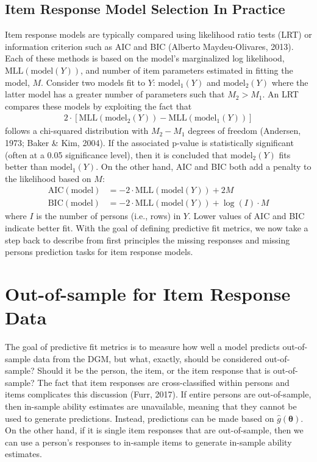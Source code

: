 \documentclass[
  english,
  man,floatsintext]{apa7}
\begin{document}
\hypertarget{item-response-model-selection-in-practice}{%
\subsection{Item Response Model Selection In Practice}\label{item-response-model-selection-in-practice}}

Item response models are typically compared using likelihood ratio tests (LRT) or information criterion such as AIC and BIC (Alberto Maydeu-Olivares, 2013). Each of these methods is based on the model's marginalized log likelihood, \(\text{MLL}(\text{model}(Y))\), and number of item parameters estimated in fitting the model, \(M\). Consider two models fit to \(Y\): \(\text{model}_1(Y)\) and \(\text{model}_2(Y)\) where the latter model has a greater number of parameters such that \(M_2 > M_1\). An LRT compares these models by exploiting the fact that
\begin{align}
2 \cdot [\text{MLL}(\text{model}_2(Y)) - \text{MLL}(\text{model}_1(Y))]
\end{align}
follows a chi-squared distribution with \(M_2 - M_1\) degrees of freedom (Andersen, 1973; Baker \& Kim, 2004). If the associated p-value is statistically significant (often at a 0.05 significance level), then it is concluded that \(\text{model}_2(Y)\) fits better than \(\text{model}_1(Y)\). On the other hand, AIC and BIC both add a penalty to the likelihood based on \(M\):
\begin{align}
\text{AIC}(\text{model}) &= -2 \cdot \text{MLL}(\text{model}(Y)) + 2M \\
\text{BIC}(\text{model}) &= -2 \cdot \text{MLL}(\text{model}(Y)) + \log(I) \cdot M
\end{align}
where \(I\) is the number of persons (i.e., rows) in \(Y\). Lower values of AIC and BIC indicate better fit. With the goal of defining predictive fit metrics, we now take a step back to describe from first principles the missing responses and missing persons prediction tasks for item response models.

\hypertarget{oos}{%
\section{Out-of-sample for Item Response Data}\label{oos}}

The goal of predictive fit metrics is to measure how well a model predicts out-of-sample data from the DGM, but what, exactly, should be considered out-of-sample? Should it be the person, the item, or the item response that is out-of-sample? The fact that item responses are cross-classified within persons and items complicates this discussion (Furr, 2017). If entire persons are out-of-sample, then in-sample ability estimates are unavailable, meaning that they cannot be used to generate predictions. Instead, predictions can be made based on \(\hat g(\bm{\theta})\). On the other hand, if it is single item responses that are out-of-sample, then we can use a person's responses to in-sample items to generate in-sample ability estimates.
\end{document}

